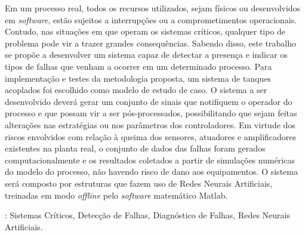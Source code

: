 Em um processo real, todos os recursos utilizados, sejam físicos ou
desenvolvidos em {\it software}, estão sujeitos a interrupções ou a
comprometimentos operacionais. Contudo, nas situações em que operam os sistemas
críticos, qualquer tipo de problema pode vir a trazer grandes consequências.
Sabendo disso, este trabalho se propõe a desenvolver um sistema capaz de
detectar a presença e indicar os tipos de falhas que venham a ocorrer em um
determinado processo. Para implementação e testes da metodologia proposta, um
sistema de tanques acoplados foi escolhido como modelo de estudo de caso. O
sistema a ser desenvolvido deverá gerar um conjunto de sinais que notifiquem o
operador do processo e que possam vir a ser pós-processados, possibilitando que
sejam feitas alterações nas estratégias ou nos parâmetros dos controladores. Em
virtude dos riscos envolvidos com relação à queima dos sensores, atuadores e
amplificadores existentes na planta real, o conjunto de dados das falhas foram
gerados computacionalmente e os resultados coletados a partir de simulações
numéricas do modelo do processo, não havendo risco de dano aos equipamentos. O
sistema será composto por estruturas que fazem uso de Redes Neurais Artificiais,
treinadas em modo {\it offline} pelo {\it software} matemático Matlab\reg.

\vspace{1.5ex}

: Sistemas Críticos, Detecção de Falhas, Diagnóstico de
Falhas, Redes Neurais Artificiais.
